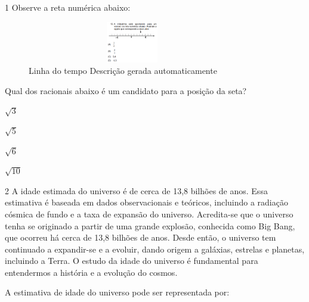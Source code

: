 {{{\begin{escolha}
{{{{{\begin{escolha}
\begin{escolha}
{\begin{q°}
\num{1} Observe a reta numérica abaixo:

\begin{figure}
\centering
\includegraphics[width=3.60725in,height=0.70833in]{./_SAEB_9_MAT/media/image250.png}
\caption{Linha do tempo Descrição gerada automaticamente}
\end{figure}


Qual dos racionais abaixo é um candidato para a posição da seta?


\begin{escolha}

  \item $\sqrt{3}$

  \item $\sqrt{5}$

  \item $\sqrt{6}$

  \item $\sqrt{10}$


\end{escolha}


\num{2} A idade estimada do universo é de cerca de 13,8 bilhões de anos. Essa
estimativa é baseada em dados observacionais e teóricos, incluindo a
radiação cósmica de fundo e a taxa de expansão do universo.
Acredita-se que o universo tenha se originado a partir de uma grande
explosão, conhecida como Big Bang, que ocorreu há cerca de 13,8
bilhões de anos. Desde então, o universo tem continuado a expandir-se
e a evoluir, dando origem a galáxias, estrelas e planetas, incluindo a
Terra. O estudo da idade do universo é fundamental para entendermos a
história e a evolução do cosmos.

A estimativa de idade do universo pode ser representada por:

\begin{escolha}


\end{escolha}
\end{q°}}
\end{escolha}
\end{escolha}}}}}}
\end{escolha}}}}
